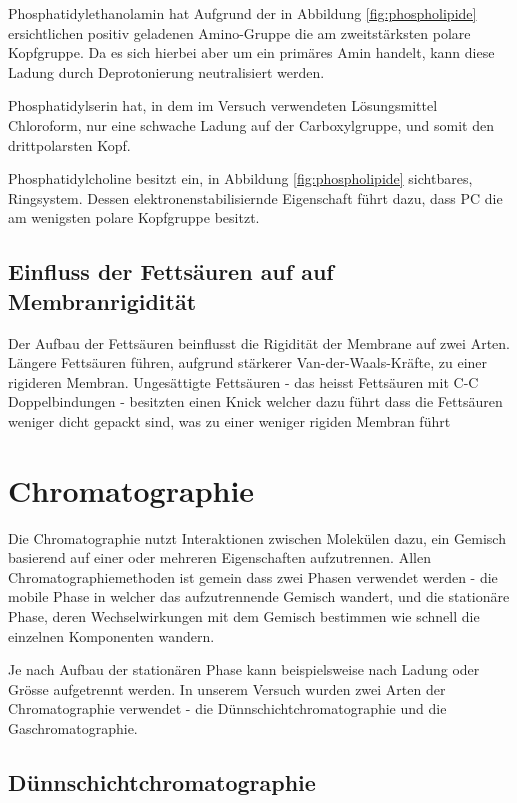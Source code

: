 \documentclass[a4paper,english]{scrreprt}
\begin{document}
Phosphatidylethanolamin hat Aufgrund der in Abbildung \ref{fig:phospholipide}
ersichtlichen positiv geladenen Amino-Gruppe die am zweitstärksten polare
Kopfgruppe. Da es sich hierbei aber um ein primäres Amin handelt, kann diese
Ladung durch Deprotonierung neutralisiert werden.

Phosphatidylserin hat, in dem im Versuch verwendeten Lösungsmittel Chloroform,
nur eine schwache Ladung auf der Carboxylgruppe, und somit den drittpolarsten
Kopf.

Phosphatidylcholine besitzt ein, in Abbildung \ref{fig:phospholipide}
sichtbares, Ringsystem. Dessen elektronenstabilisiernde Eigenschaft führt dazu,
dass PC die am wenigsten polare Kopfgruppe besitzt.

\subsection{Einfluss der Fettsäuren auf auf Membranrigidität}

Der Aufbau der Fettsäuren beinflusst die Rigidität der Membrane auf zwei Arten.
Längere Fettsäuren führen, aufgrund stärkerer Van-der-Waals-Kräfte, zu einer
rigideren Membran. Ungesättigte Fettsäuren - das heisst Fettsäuren mit C-C
Doppelbindungen - besitzten einen Knick welcher dazu führt dass die Fettsäuren
weniger dicht gepackt sind, was zu einer weniger rigiden Membran führt

\section{Chromatographie}

Die Chromatographie nutzt Interaktionen zwischen Molekülen dazu, ein Gemisch
basierend auf einer oder mehreren Eigenschaften aufzutrennen. Allen
Chromatographiemethoden ist gemein dass zwei Phasen verwendet werden - die
mobile Phase in welcher das aufzutrennende Gemisch wandert, und die stationäre
Phase, deren Wechselwirkungen mit dem Gemisch bestimmen wie schnell die
einzelnen Komponenten wandern.

Je nach Aufbau der stationären Phase kann beispielsweise nach Ladung oder
Grösse aufgetrennt werden. In unserem Versuch wurden zwei Arten der
Chromatographie verwendet - die Dünnschichtchromatographie und die
Gaschromatographie.

\subsection{Dünnschichtchromatographie}
\end{document}
